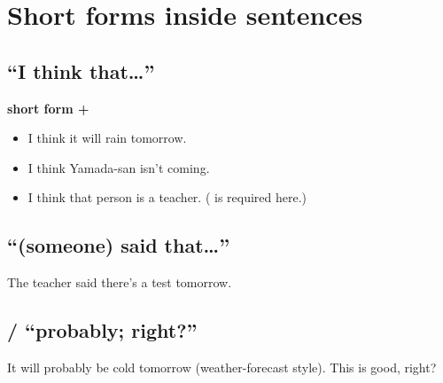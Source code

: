 \section{Short forms inside sentences}

\subsection{ ``I think that\ldots''}
\textbf{short form + }
\begin{example}
\leavevmode
\begin{itemize}
  \item {} I think it will rain tomorrow.
  \item {} I think Yamada-san isn't coming.
  \item {} I think that person is a teacher.
        ( is required here.)
\end{itemize}
\end{example}

\subsection{ ``(someone) said that\ldots''}
 The teacher said there's a test
tomorrow.

\subsection{/ ``probably; right?''}
 It will probably be cold tomorrow (weather-forecast style).
 This is good, right?

